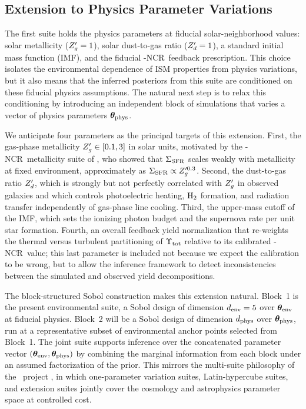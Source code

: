 \subsection{Extension to Physics Parameter Variations}
\label{sec:disc_phys}

The first suite holds the physics parameters at fiducial
solar-neighborhood values: solar metallicity ($Z_g' = 1$), solar
dust-to-gas ratio ($Z_d' = 1$), a standard initial mass function (IMF),
and the fiducial \TIGRESS-NCR\ feedback prescription. This choice
isolates the environmental dependence of ISM properties from physics
variations, but it also means that the inferred posteriors from this
suite are conditioned on these fiducial physics assumptions. The
natural next step is to relax this conditioning by introducing an
independent block of simulations that varies a vector of physics
parameters $\boldsymbol{\theta}_{\rm phys}$.

We anticipate four parameters as the principal targets of this
extension. First, the gas-phase metallicity $Z_g' \in [0.1, 3]$ in solar
units, motivated by the \TIGRESS-NCR\ metallicity suite of
\citet{2024ApJ...972...67K}, who showed that $\Sigma_{\rm SFR}$ scales weakly with
metallicity at fixed environment, approximately as $\Sigma_{\rm SFR} \propto
Z_g'^{0.3}$.  Second, the dust-to-gas ratio $Z_d'$, which is
strongly but not perfectly correlated with $Z_g'$ in observed galaxies
and which controls photoelectric heating, ${\rm H}_2$ formation, and
radiation transfer independently of gas-phase line cooling. Third, the
upper-mass cutoff of the IMF, which sets the ionizing photon budget and
the supernova rate per unit star formation. Fourth, an overall feedback
yield normalization that re-weights the thermal versus turbulent
partitioning of $\Upsilon_{\rm tot}$ relative to its calibrated \TIGRESS-NCR\ value;
this last parameter is included not because we expect the calibration
to be wrong, but to allow the inference framework to detect
inconsistencies between the simulated and observed yield decompositions.

The block-structured Sobol construction makes this extension natural.
Block~1 is the present environmental suite, a Sobol design of dimension
$d_{\rm env} = 5$ over $\boldsymbol{\theta}_{\rm env}$ at fiducial physics. Block~2 will be
a Sobol design of dimension $d_{\rm phys}$ over $\boldsymbol{\theta}_{\rm phys}$, run at a
representative subset of environmental anchor points selected from
Block~1. The joint suite supports inference over the concatenated
parameter vector $(\boldsymbol{\theta}_{\rm env}, \boldsymbol{\theta}_{\rm phys})$ by combining the marginal
information from each block under an assumed factorization of the
prior. This mirrors the multi-suite philosophy of the \CAMELS\ project
\citep{2021ApJ...915...71V}, in which one-parameter variation suites,
Latin-hypercube suites, and extension suites jointly cover the
cosmology and astrophysics parameter space at controlled cost.

